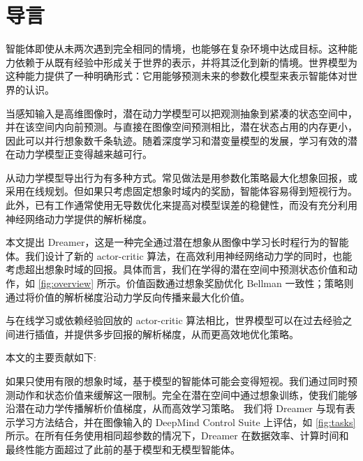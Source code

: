 \suppressfloats

\section{导言}
\label{sec:intro}

\begingroup
\setlength\intextsep{0pt}


智能体即使从未两次遇到完全相同的情境，也能够在复杂环境中达成目标。这种能力依赖于从既有经验中形成关于世界的表示，并将其泛化到新的情境。世界模型为这种能力提供了一种明确形式：它用能够预测未来的参数化模型来表示智能体对世界的认识。

当感知输入是高维图像时，潜在动力学模型可以把观测抽象到紧凑的状态空间中，并在该空间内向前预测\citep{watter2015e2c,oh2017vpn,gregor2019beliefstate}。与直接在图像空间预测相比，潜在状态占用的内存更小，因此可以并行想象数千条轨迹。随着深度学习和潜变量模型的发展，学习有效的潜在动力学模型正变得越来越可行\citep{krishnan2015deepkalman,karl2016dvbf,doerr2018prssm,buesing2018dssm}。

从动力学模型导出行为有多种方式。常见做法是用参数化策略最大化想象回报\citep{sutton1991dyna,ha2018worldmodels,zhang2018solar}，或采用在线规划\citep{chua2018pets,hafner2018planet}。但如果只考虑固定想象时域内的奖励，智能体容易得到短视行为\citep{tingwu2019benchmark}。此外，已有工作通常使用无导数优化来提高对模型误差的稳健性\citep{ebert2017visualmpc,chua2018pets,parmas2019pipps}，而没有充分利用神经网络动力学提供的解析梯度\citep{henaff2019planbybackprop,srinivas2018upn}。

本文提出 Dreamer，这是一种完全通过潜在想象从图像中学习长时程行为的智能体。我们设计了新的 actor-critic 算法，在高效利用神经网络动力学的同时，也能考虑超出想象时域的回报。具体而言，我们在学得的潜在空间中预测状态价值和动作，如 \cref{fig:overview} 所示。价值函数通过想象奖励优化 Bellman 一致性；策略则通过将价值的解析梯度沿动力学反向传播来最大化价值。

与在线学习或依赖经验回放的 actor-critic 算法相比\citep{lillicrap2015ddpg,mnih2016a3c,schulman2017ppo,haarnoja2018sac,lee2019slac}，世界模型可以在过去经验之间进行插值，并提供多步回报的解析梯度，从而更高效地优化策略。

\pagebreak

本文的主要贡献如下:
\endgroup
\begin{itemize}
 如果只使用有限的想象时域，基于模型的智能体可能会变得短视。我们通过同时预测动作和状态价值来缓解这一限制。完全在潜在空间中通过想象训练，使我们能够沿潜在动力学传播解析价值梯度，从而高效学习策略。
 我们将 Dreamer 与现有表示学习方法结合，并在图像输入的 DeepMind Control Suite 上评估，如 \cref{fig:tasks} 所示。在所有任务使用相同超参数的情况下，Dreamer 在数据效率、计算时间和最终性能方面超过了此前的基于模型和无模型智能体。
\end{itemize}
